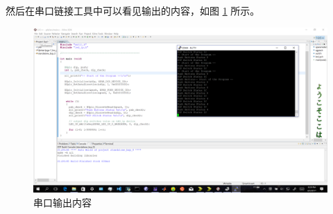 \documentclass{ctexart}
\begin{document}
        然后在串口链接工具中可以看见输出的内容，如图 \ref{fig:report4-2} 所示。


\begin{figure}
\centering
\includegraphics[width=1\linewidth]{report4-2}
\caption{串口输出内容}
\label{fig:report4-2}
\end{figure}
\end{document}
